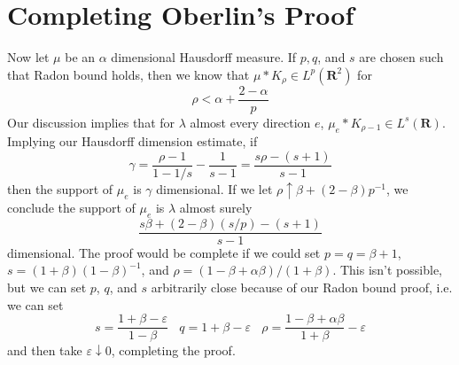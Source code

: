 \documentclass{article}
\theoremstyle{plain}
\theoremstyle{remark}
\theoremstyle{definition}
\begin{document}
\section{Completing Oberlin's Proof}

Now let $\mu$ be an $\alpha$ dimensional Hausdorff measure.  If $p,q$, and $s$ are chosen such that Radon bound holds, then we know that $\mu * K_\rho \in L^p(\mathbf{R}^2)$ for
%
\[ \rho < \alpha + \frac{2 - \alpha}{p} \]
%
Our discussion implies that for $\lambda$ almost every direction $e$, $\mu_e * K_{\rho - 1} \in L^s(\mathbf{R})$. Implying our Hausdorff dimension estimate, if
%
\[ \gamma = \frac{\rho - 1}{1 - 1/s} - \frac{1}{s - 1} = \frac{s \rho - (s + 1)}{s - 1} \]
%
then the support of $\mu_e$ is $\gamma$ dimensional. If we let $\rho \uparrow \beta + (2 - \beta)p^{-1}$, we conclude the support of $\mu_e$ is $\lambda$ almost surely
%
\[ \frac{s \beta + (2 - \beta)(s/p) - (s + 1)}{s - 1} \]
%
dimensional. The proof would be complete if we could set $p = q = \beta + 1$, $s = (1 + \beta)(1 - \beta)^{-1}$, and $\rho = (1 - \beta + \alpha \beta)/(1 + \beta)$. This isn't possible, but we can set $p$, $q$, and $s$ arbitrarily close because of our Radon bound proof, i.e. we can set
%
\[ s = \frac{1 + \beta - \varepsilon}{1 - \beta}\ \ \ \ q = 1 + \beta - \varepsilon\ \ \ \ \rho = \frac{1 - \beta + \alpha \beta}{1 + \beta} - \varepsilon \]
%
and then take $\varepsilon \downarrow 0$, completing the proof.

\begin{comment}

we find
%
\[ \int_{S^1}  \| \mu_e * K_{(1 - \alpha + \alpha \beta)/(1 + \alpha) - \varepsilon} \|_{(1 + \alpha - \varepsilon)/(1 - \alpha)}^{1 + \alpha - \varepsilon} < \infty \]
%
This shows that the support of $\mu_e$ is $\lambda$ almost surely
%
\begin{align*}
	\beta &= \frac{(1 - \alpha + \alpha \beta) - \varepsilon(1 + \alpha)}{(1 + \alpha)(1 - (1 - \alpha)/(1 + \alpha - \varepsilon))} - \frac{1}{(1 + \alpha - \varepsilon)/(1 - \alpha) - 1}\\
	&= (1 + \alpha - \varepsilon) \frac{(1 - \alpha + \alpha \beta) - \varepsilon(1 + \alpha)}{(1 + \alpha)(2\alpha - \varepsilon)} - \frac{1 - \alpha}{2\alpha - \varepsilon}
\end{align*}
%
dimensional. Taking $\varepsilon \to 0$, we conclude that the support of $\mu_e$ is $\lambda$ almost surely
%
\[ \frac{1 - \alpha + \alpha \beta}{2\alpha} - \frac{1 - \alpha}{2\alpha} = \beta / 2 \]
%
dimensional. This completes the calculation which allows us to prove the dimension bound.

\end{comment}
\end{document}
